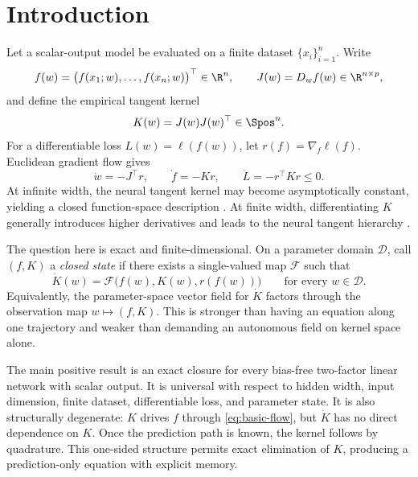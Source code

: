 \section{Introduction}
\label{sec:introduction}

Let a scalar-output model be evaluated on a finite dataset $\{x_i\}_{i=1}^n$.  Write
\begin{equation}
  f(w)=\bigl(f(x_1;w),\ldots,f(x_n;w)\bigr)^\top\in\R^n,
  \qquad
  J(w)=D_w f(w)\in\R^{n\times p},
\end{equation}
and define the empirical tangent kernel
\begin{equation}
  K(w)=J(w)J(w)^\top\in\Spos^n.
\end{equation}
For a differentiable loss $L(w)=\ell(f(w))$, let $r(f)=\nabla_f\ell(f)$.  Euclidean gradient flow gives
\begin{equation}
  \dot w=-J^\top r,
  \qquad
  \dot f=-Kr,
  \qquad
  \dot L=-r^\top Kr\leq0.
  \label{eq:basic-flow}
\end{equation}
At infinite width, the neural tangent kernel may become asymptotically constant, yielding a closed function-space description \citep{jacot2018ntk,lee2019linearized}.  At finite width, differentiating $K$ generally introduces higher derivatives and leads to the neural tangent hierarchy \citep{huang2020nth}.

The question here is exact and finite-dimensional.  On a parameter domain $\mathcal D$, call $(f,K)$ a \emph{closed state} if there exists a single-valued map $\mathcal F$ such that
\begin{equation}
  \dot K(w)=\mathcal F\bigl(f(w),K(w),r(f(w))\bigr)
  \qquad \text{for every }w\in\mathcal D.
  \label{eq:closure-definition}
\end{equation}
Equivalently, the parameter-space vector field for $\dot K$ factors through the observation map $w\mapsto(f,K)$.  This is stronger than having an equation along one trajectory and weaker than demanding an autonomous field on kernel space alone.

The main positive result is an exact closure for every bias-free two-factor linear network with scalar output.  It is universal with respect to hidden width, input dimension, finite dataset, differentiable loss, and parameter state.  It is also structurally degenerate: $K$ drives $f$ through \eqref{eq:basic-flow}, but $\dot K$ has no direct dependence on $K$.  Once the prediction path is known, the kernel follows by quadrature.  This one-sided structure permits exact elimination of $K$, producing a prediction-only equation with explicit memory.

